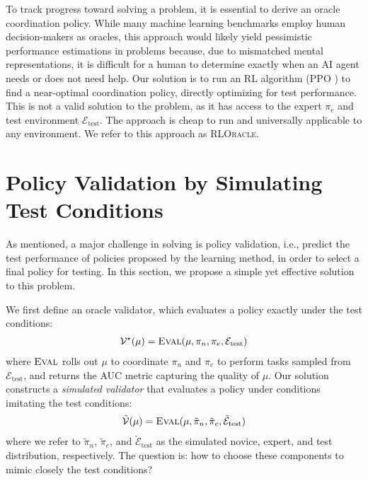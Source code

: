 To track progress toward solving a \ourMethod problem, it is essential to derive an oracle coordination policy.
While many machine learning benchmarks employ human decision-makers as oracles, this approach would likely yield pessimistic performance estimations in \ourMethod problems because, due to mismatched mental representations, it is difficult for a human to determine exactly when an AI agent needs or does not need help.
Our solution is to run an RL algorithm (PPO \citep{schulman2017proximal}) to find a near-optimal coordination policy, directly optimizing for test performance.
This is not a valid solution to the problem, as it has access to the expert $\pi_e$ and test environment $\mathcal{E}_{\text{test}}$.
The approach is cheap to run and universally applicable to any environment. 
We refer to this approach as \textsc{RLOracle}.


\section{Policy Validation by Simulating Test Conditions} \label{sec:sim-val}

As mentioned, a major challenge in solving \ourMethod is policy validation, i.e., predict the test performance of policies proposed by the learning method, in order to select a final policy for testing. 
In this section, we propose a simple yet effective solution to this problem. 


We first define an oracle validator, which evaluates a policy exactly under the test conditions:
\begin{align}
    \mathcal{V}^{\star}(\mu) = \textsc{Eval}(\mu, \pi_{n}, \pi_{e}, \mathcal{E}_{\textrm{test}})
\end{align} where $\textsc{Eval}$ rolls out $\mu$ to coordinate $\pi_n$ and $\pi_e$ to perform tasks sampled from $\mathcal{E}_{\textrm{test}}$, and returns the AUC metric capturing the quality of $\mu$.
Our solution constructs a \textit{simulated validator} that evaluates a policy under conditions imitating the test conditions:
\begin{align}
    \mathcal{\tilde V}(\mu) = \textsc{Eval}(\mu, \tilde \pi_{n}, \tilde \pi_{e},\mathcal{ \tilde E}_{\textrm{test}})
\end{align} where we refer to $\tilde \pi_n$, $\tilde \pi_e$, and $\mathcal{\tilde E}_{\textrm{test}}$ as the simulated novice, expert, and test distribution, respectively.
The question is: how to choose these components to mimic closely the test conditions?

